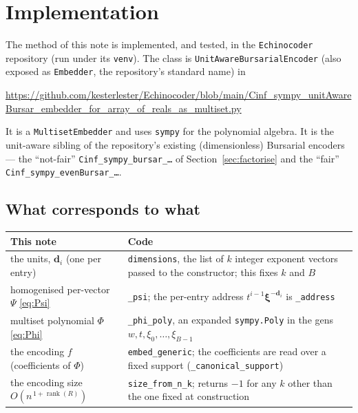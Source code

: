 \documentclass[11pt,a4paper]{article}
\theoremstyle{definition}
\theoremstyle{plain}
\newcommand{\bvec}[1]{\mathbf{#1}}
\begin{document}
\appendix
\section{Implementation}
\label{app:impl}

The method of this note is implemented, and tested, in the \texttt{Echinocoder}
repository (run under its \texttt{venv}). The class is
\texttt{UnitAwareBursarialEncoder} (also exposed as \texttt{Embedder}, the
repository's standard name) in
\begin{center}
\url{https://github.com/kesterlester/Echinocoder/blob/main/Cinf_sympy_unitAwareBursar_embedder_for_array_of_reals_as_multiset.py}
\end{center}
It is a \texttt{MultisetEmbedder} and uses \texttt{sympy} for the polynomial
algebra. It is the unit-aware sibling of the repository's existing (dimensionless)
Bursarial encoders --- the ``not-fair'' \texttt{Cinf\_sympy\_bursar\_\dots} of
Section~\ref{sec:factorise} and the ``fair'' \texttt{Cinf\_sympy\_evenBursar\_\dots}.

\subsection*{What corresponds to what}

\begin{center}
\renewcommand{\arraystretch}{1.25}
\begin{tabular}{@{}p{5.6cm}p{9.0cm}@{}}
\hline
\textbf{This note} & \textbf{Code} \\
\hline
the units, $\bvec d_i$ (one per entry) &
  \texttt{dimensions}, the list of $k$ integer exponent vectors passed to the
  constructor; this fixes $k$ and $B$ \\
homogenised per-vector $\Psi$ \eqref{eq:Psi} &
  \texttt{\_psi}; the per-entry address $t^{i-1}\boldsymbol\xi^{-\bvec d_i}$ is
  \texttt{\_address} \\
multiset polynomial $\Phi$ \eqref{eq:Phi} &
  \texttt{\_phi\_poly}, an expanded \texttt{sympy.Poly} in the gens
  $w,t,\xi_0,\dots,\xi_{B-1}$ \\
the encoding $f$ (coefficients of $\Phi$) &
  \texttt{embed\_generic}; the coefficients are read over a fixed support
  (\texttt{\_canonical\_support}) \\
the encoding size $O(n^{\,1+\operatorname{rank}(R)})$ &
  \texttt{size\_from\_n\_k}; returns $-1$ for any $k$ other than the one fixed at
  construction \\
\hline
\end{tabular}
\end{center}
\end{document}
